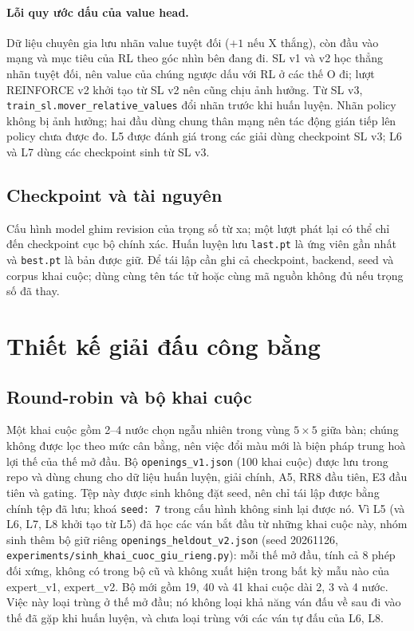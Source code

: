 \paragraph{Lỗi quy ước dấu của value head.} Dữ liệu chuyên gia lưu nhãn value tuyệt đối ($+1$ nếu X thắng), còn đầu vào mạng và mục tiêu của RL theo góc nhìn bên đang đi. SL v1 và v2 học thẳng nhãn tuyệt đối, nên value của chúng ngược dấu với RL ở các thế O đi; lượt REINFORCE v2 khởi tạo từ SL v2 nên cũng chịu ảnh hưởng. Từ SL v3, \texttt{train\_sl.mover\_relative\_values} đổi nhãn trước khi huấn luyện. Nhãn policy không bị ảnh hưởng; hai đầu dùng chung thân mạng nên tác động gián tiếp lên policy chưa được đo. L5 được đánh giá trong các giải dùng checkpoint SL v3; L6 và L7 dùng các checkpoint sinh từ SL v3.

\subsection{Checkpoint và tài nguyên}
Cấu hình model ghim revision của trọng số từ xa; một lượt phát lại có thể chỉ đến checkpoint cục bộ chính xác. Huấn luyện lưu \texttt{last.pt} là ứng viên gần nhất và \texttt{best.pt} là bản được giữ. Để tái lập cần ghi cả checkpoint, backend, seed và corpus khai cuộc; dùng cùng tên tác tử hoặc cùng mã nguồn không đủ nếu trọng số đã thay.

\section{Thiết kế giải đấu công bằng}
\subsection{Round-robin và bộ khai cuộc}
\label{sec:khai-cuoc}
Một khai cuộc gồm 2--4 nước chọn ngẫu nhiên trong vùng $5\times5$ giữa bàn; chúng không được lọc theo mức cân bằng, nên việc đổi màu mới là biện pháp trung hoà lợi thế của thế mở đầu. Bộ \texttt{openings\_v1.json} (100 khai cuộc) được lưu trong repo và dùng chung cho dữ liệu huấn luyện, giải chính, A5, RR8 đầu tiên, E3 đầu tiên và gating. Tệp này được sinh không đặt seed, nên chỉ tái lập được bằng chính tệp đã lưu; khoá \texttt{seed: 7} trong cấu hình không sinh lại được nó. Vì L5 (và L6, L7, L8 khởi tạo từ L5) đã học các ván bắt đầu từ những khai cuộc này, nhóm sinh thêm bộ giữ riêng \texttt{openings\_heldout\_v2.json} (seed 20261126, \texttt{experiments/sinh\_khai\_cuoc\_giu\_rieng.py}): mỗi thế mở đầu, tính cả 8 phép đối xứng, không có trong bộ cũ và không xuất hiện trong bất kỳ mẫu nào của expert\_v1, expert\_v2. Bộ mới gồm 19, 40 và 41 khai cuộc dài 2, 3 và 4 nước. Việc này loại trùng ở thế mở đầu; nó không loại khả năng ván đấu về sau đi vào thế đã gặp khi huấn luyện, và chưa loại trùng với các ván tự đấu của L6, L8.

